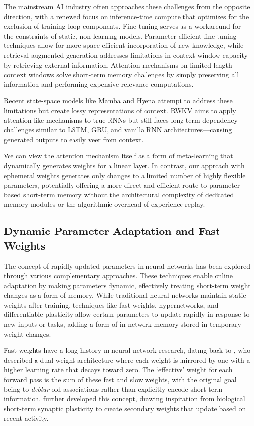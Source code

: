 \documentclass[conference]{IEEEtran}
\begin{document}
The mainstream AI industry often approaches these challenges from the opposite direction, with a renewed focus on inference-time compute that optimizes for the exclusion of training loop components. Fine-tuning serves as a workaround for the constraints of static, non-learning models. Parameter-efficient fine-tuning techniques allow for more space-efficient incorporation of new knowledge, while retrieval-augmented generation addresses limitations in context window capacity by retrieving external information. Attention mechanisms on limited-length context windows solve short-term memory challenges by simply preserving all information and performing expensive relevance computations.

Recent state-space models like Mamba and Hyena attempt to address these limitations but create lossy representations of context. RWKV aims to apply attention-like mechanisms to true RNNs but still faces long-term dependency challenges similar to LSTM, GRU, and vanilla RNN architectures—causing generated outputs to easily veer from context.

We can view the attention mechanism itself as a form of meta-learning that dynamically generates weights for a linear layer. In contrast, our approach with ephemeral weights generates only changes to a limited number of highly flexible parameters, potentially offering a more direct and efficient route to parameter-based short-term memory without the architectural complexity of dedicated memory modules or the algorithmic overhead of experience replay.

\subsection{Dynamic Parameter Adaptation and Fast Weights}

The concept of rapidly updated parameters in neural networks has been explored through various complementary approaches. These techniques enable online adaptation by making parameters dynamic, effectively treating short-term weight changes as a form of memory. While traditional neural networks maintain static weights after training, techniques like fast weights, hypernetworks, and differentiable plasticity allow certain parameters to update rapidly in response to new inputs or tasks, adding a form of in-network memory stored in temporary weight changes.

Fast weights have a long history in neural network research, dating back to \cite{hintonUsingFastWeights1987}, who described a dual weight architecture where each weight is mirrored by one with a higher learning rate that decays toward zero. The `effective' weight for each forward pass is the sum of these fast and slow weights, with the original goal being to \emph{deblur} old associations rather than explicitly encode short-term information. \cite{schmidhuberLearningControlFastweight1992} further developed this concept, drawing inspiration from biological short-term synaptic plasticity to create secondary weights that update based on recent activity.
\end{document}
